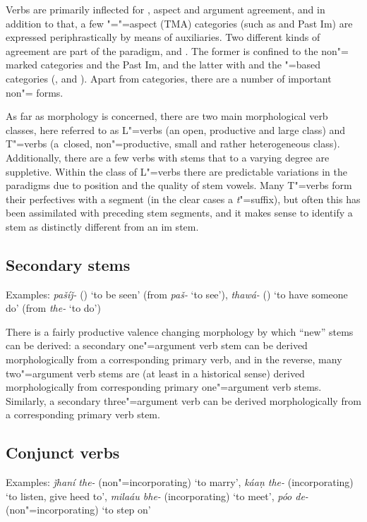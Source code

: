 Verbs are primarily inflected for , aspect and argument agreement, and in addition to that, a few "="=aspect (TMA) categories (such as  and Past Im) are expressed periphrastically by means of auxiliaries. Two different kinds of agreement are part of the paradigm,  and . The former is confined to the non"= marked categories  and the Past Im, and the latter with  and the "=based categories (,  and ). Apart from   categories, there are a number of important non"= forms.


As far as  morphology is concerned, there are two main morphological verb classes, here referred to as L"=verbs (an open, productive and large class) and T"=verbs (a~closed, non"=productive, small and rather heterogeneous class). Additionally, there are a few verbs with stems that to a varying degree are suppletive. Within the class of L"=verbs there are predictable variations in the  paradigms due to  position and the quality of stem vowels. Many T"=verbs form their perfectives with a  segment (in the clear cases a \textit{t}"=suffix), but often this has been assimilated with preceding stem segments, and it makes sense to identify a  stem as distinctly different from an im stem.


\subsection{Secondary stems}
\label{subsec:3b-3-1}
Examples: \textit{pašíǰ-} () `to be seen' (from \textit{paš-} `to see'), \textit{thawá-} () `to have someone do' (from \textit{the-} `to do')


There is a fairly productive valence changing morphology by which “new” stems can be derived: a secondary one"=argument verb stem can be derived morphologically from a corresponding primary  verb, and in the reverse, many two"=argument verb stems are (at least in a historical sense) derived morphologically from corresponding primary one"=argument verb stems. Similarly, a secondary three"=argument verb can be derived morphologically from a corresponding primary  verb stem. 


\subsection{Conjunct verbs}
\label{subsec:3b-3-2}
Examples: \textit{ǰhaní the-} (non"=incorporating) `to marry', \textit{káaṇ the-} (incorporating) `to listen, give heed to', \textit{milaáu bhe-} (incorporating) `to meet', \textit{póo de-} (non"=incorporating) `to step on'


